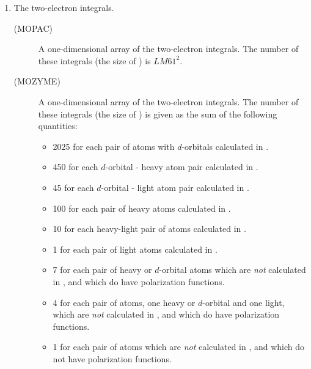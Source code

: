 \begin{enumerate}
\item {} The two-electron integrals. 
\begin{description}
\item[(MOPAC) ]  A one-dimensional array of the two-electron
integrals. The number of these integrals (the size of ) is $LM61^2$.
\item[(MOZYME) ]\label{n16} A one-dimensional array of the
two-electron integrals. The number of these integrals (the size of ) is
given as the sum of the following quantities:

\begin{itemize}
\item 2025 for each pair of atoms with $d$-orbitals calculated in .
\item 450 for each $d$-orbital - heavy atom pair  calculated in .
\item 45 for each $d$-orbital - light atom pair  calculated in .
\item 100 for each pair of heavy atoms calculated in .
\item 10 for each heavy-light pair of atoms calculated in .
\item 1 for each pair of light atoms calculated in .
\item 7 for each pair of heavy or $d$-orbital atoms which are {\em not} 
calculated in , and which do have polarization functions.
\item 4 for each pair of atoms, one heavy or $d$-orbital and one light,  which 
are {\em not} calculated in , and which do have polarization functions.
\item 1 for each pair of atoms which are {\em not} calculated in , and
which do not have polarization functions.
\end{itemize}


\end{description}
\end{enumerate}
